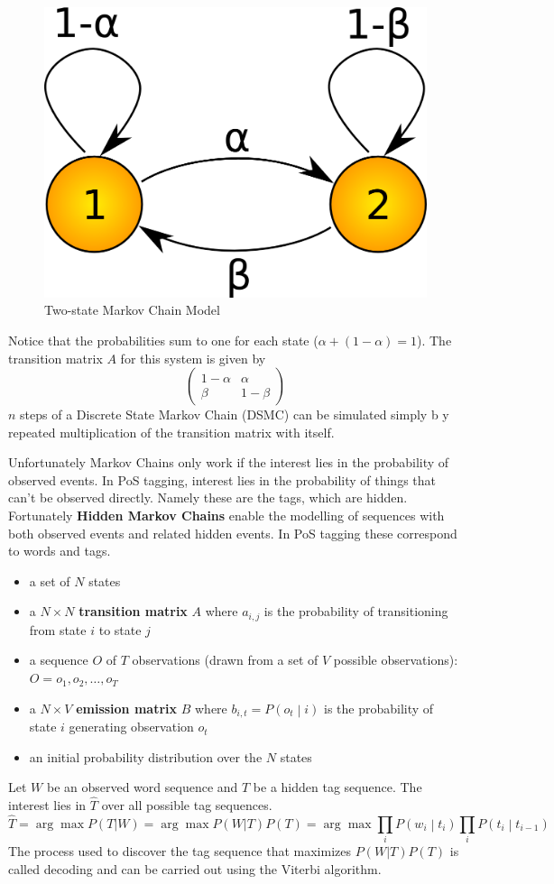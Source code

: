 \documentclass[11pt]{article}
\begin{document}
\begin{figure}[H]
	\centering
	\includegraphics[width=0.4\linewidth]{img/two_state_markov_model.png}
	\caption{Two-state Markov Chain Model \parencite{markov}}
\end{figure}

Notice that the probabilities sum to one for each state ($ \alpha + (1-\alpha) = 1$). The transition matrix $A$ for this system is given by
\begin{equation*}
	\begin{pmatrix}
	1-\alpha & \alpha\\
	\beta & 1-\beta
	\end{pmatrix}
\end{equation*}
$n$ steps of a Discrete State Markov Chain (DSMC) can be simulated simply b y repeated multiplication of the transition matrix with itself.

Unfortunately Markov Chains only work if the interest lies in the probability of observed events. In PoS tagging, interest lies in the probability of things that can't be observed directly. Namely these are the tags, which are hidden. Fortunately \textbf{Hidden Markov Chains} enable the modelling of sequences with both observed events and related hidden events. In PoS tagging these correspond to words and tags.
\begin{itemize}
	\item a set of $N$ states
	\item a $N\times N$ \textbf{transition matrix} $A$ where $a_{i,j}$ is the probability of transitioning from state $i$ to state $j$
	\item a sequence $O$ of $T$ observations (drawn from a set of $V$ possible observations): $O = o_1, o_2, \dots, o_T$
	\item a $N\times V$ \textbf{emission matrix} $B$ where $b_{i,t} = P\left(o_t\middle| i\right)$ is the probability of state $i$ generating observation $o_t$
	\item an initial probability distribution over the $N$ states
\end{itemize}
Let $W$ be an observed word sequence and $T$ be a hidden tag sequence. The interest lies in $\hat{T}$ over all possible tag sequences.
\begin{equation*}
	\hat{T} = \arg\max P(T|W) =\arg\max P(W|T)P(T) = \arg\max \prod_{i} P\left( w_i \middle| t_i \right) \prod_{i} P\left( t_i \middle| t_{i-1} \right)
\end{equation*}
The process used to discover the tag sequence that maximizes $P(W|T)P(T)$ is called decoding and can be carried out using the Viterbi algorithm.
\end{document}
